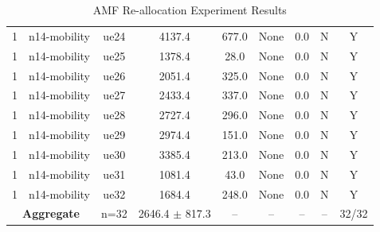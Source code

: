 \begin{table}[ht]
\begin{tabular}{|c|c|c|c|c|c|c|c|c|}
1 & n14-mobility & ue24 & 4137.4 & 677.0 & None & 0.0 & N & Y \\
1 & n14-mobility & ue25 & 1378.4 & 28.0 & None & 0.0 & N & Y \\
1 & n14-mobility & ue26 & 2051.4 & 325.0 & None & 0.0 & N & Y \\
1 & n14-mobility & ue27 & 2433.4 & 337.0 & None & 0.0 & N & Y \\
1 & n14-mobility & ue28 & 2727.4 & 296.0 & None & 0.0 & N & Y \\
1 & n14-mobility & ue29 & 2974.4 & 151.0 & None & 0.0 & N & Y \\
1 & n14-mobility & ue30 & 3385.4 & 213.0 & None & 0.0 & N & Y \\
1 & n14-mobility & ue31 & 1081.4 & 43.0 & None & 0.0 & N & Y \\
1 & n14-mobility & ue32 & 1684.4 & 248.0 & None & 0.0 & N & Y \\
\multicolumn{2}{|c|}{\textbf{Aggregate}} & n=32 & 2646.4 $\pm$ 817.3 & -- & -- & -- & -- & 32/32 \\
\hline
\end{tabular}
\caption{AMF Re-allocation Experiment Results}
\label{tab:amf_realloc}
\end{table}
